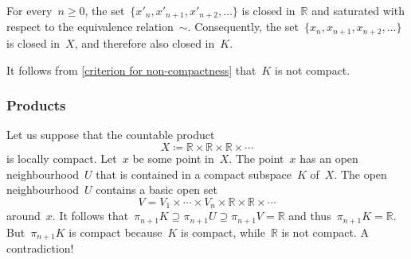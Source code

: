 For every~$n ≥ 0$, the set~$\{ x'_n, x'_{n + 1}, x'_{n + 2}, \dotsc \}$ is closed in~$ℝ$ and saturated with respect to the equivalence relation~$∼$.
Consequently, the set~$\{ x_n, x_{n + 1}, x_{n + 2}, \dotsc \}$ is closed in~$X$, and therefore also closed in~$K$.

It follows from \cref{criterion for non-compactness} that~$K$ is not compact.



\subsubsection{Products}

Let us suppose that the countable product
\[
	X ≔ ℝ × ℝ × ℝ × \dotsb
\]
is locally compact.
Let~$x$ be some point in~$X$.
The point~$x$ has an open neighbourhood~$U$ that is contained in a compact subspace~$K$ of~$X$.
The open neighbourhood~$U$ contains a basic open set
\[
	V = V_1 × \dotsb × V_n × ℝ × ℝ × \dotsb
\]
around~$x$.
It follows that~$π_{n + 1} K ⊇ π_{n + 1} U ⊇ π_{n + 1} V = ℝ$ and thus~$π_{n + 1} K = ℝ$.
But~$π_{n + 1} K$ is compact because~$K$ is compact, while~$ℝ$ is not compact.
A contradiction!
